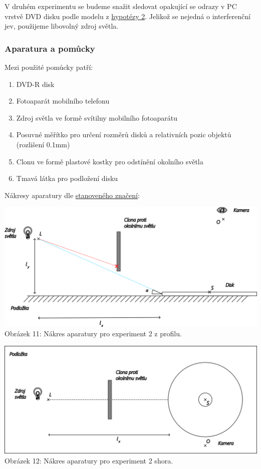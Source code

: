 \documentclass[titlepage]{article}
\begin{document}
V druhém experimentu se budeme snažit sledovat opakující se odrazy v PC vrstvě DVD disku podle modelu z \hyperref[hyp:1]{hypotézy 2}. Jelikož se nejedná o interferenční jev, použijeme libovolný zdroj světla.

\subsubsection{Aparatura a pomůcky}

Mezi použité pomůcky patří:
\begin{enumerate}
    \item DVD-R disk
    \item Fotoaparát mobilního telefonu
    \item Zdroj světla ve formě svítilny mobilního fotoaparátu
    \item Posuvné měřítko pro určení rozměrů disků a relativních pozic objektů (rozlišení 0.1mm)
    \item Clonu ve formě plastové kostky pro odstínění okolního světla
    \item Tmavá látka pro podložení disku
\end{enumerate}

Nákresy aparatury dle \hyperref[table:1]{stanoveného značení}:

 \label{image:11}
\begin{center}
    \includegraphics[width=\textwidth]{exp2_d1.png}
    \linebreak
    Obrázek 11: Nákres aparatury pro experiment 2 z profilu.
\end{center}

 \label{image:12}
\begin{center}
    \includegraphics[width=\textwidth]{exp2_d2.png}
    \linebreak
    Obrázek 12: Nákres aparatury pro experiment 2 shora.
\end{center}
\end{document}
